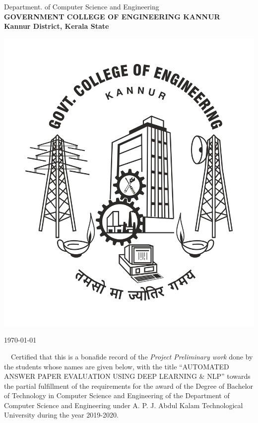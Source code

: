 \begin{center}
     { {\sc Department. of Computer Science and Engineering}}\\
     {\bf \MakeUppercase{Government College  of Engineering Kannur}}\\
     {\bf Kannur District, Kerala State}\\ \bigskip   
        
      \vspace*{25pt}
      \centerline{\includegraphics [keepaspectratio=true, scale=.2]{gcek.jpg}}
      \vspace*{2cm}
      \textbf{\large {}}
      \vspace*{1cm}     
\end{center}

\begin{flushright}
{\today}\\ \bigskip                                  
\end{flushright}

\jadafont
  {~~Certified that this  is a bonafide record of the {\em Project Preliminary work} done by the students whose names are given below, with the title ``{{\sc \large AUTOMATED ANSWER PAPER EVALUATION USING DEEP LEARNING \& NLP}}'' towards the partial fulfillment of the 
  requirements for the award of the Degree of Bachelor of Technology in Computer Science and Engineering of the 
  Department of Computer Science and Engineering under A. P. J. Abdul Kalam Technological University
  during the year 2019-2020.
  }

